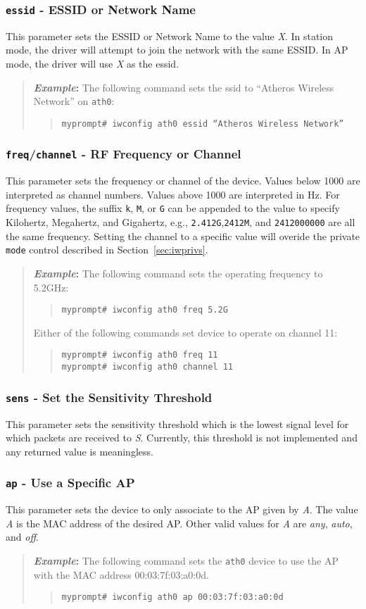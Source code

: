 \documentclass[10pt,fullpage]{article}
\newcommand{\mytt}[1]{{\texttt{#1}}}
\newcommand{\bv}{\begin{verse}}
\newcommand{\ev}{\end{verse}}
\newcommand{\cmd}[1]{{\texttt{myprompt\# #1}}}
\newcommand{\clival}[1]{{\emph{#1}}}
\newenvironment{example}{\begin{quote}\textbf{\textit{Example}:}}{\end{quote}}
\begin{document}
\subsubsection{\mytt{essid} - ESSID or Network Name}
This parameter sets the ESSID or Network Name to the value \clival{X}.  In
station mode, the driver will attempt to join the network with the
same ESSID.  In AP mode, the driver will use \clival{X} as the essid.
\begin{example}
  The following command sets the ssid to ``Atheros Wireless
  Network'' on \mytt{ath0}:
  \bv
  \cmd{iwconfig ath0 essid ``Atheros Wireless Network''}\\
  \ev
\end{example}

\subsubsection{\mytt{freq}/\mytt{channel} - RF Frequency or Channel}
This parameter sets the frequency or channel of the device.  Values
below 1000 are interpreted as channel numbers.  Values above 1000 are
interpreted in Hz.  For frequency values, the suffix \mytt{k},
\mytt{M}, or \mytt{G} can be appended to the value to specify
Kilohertz, Megahertz, and Gigahertz, e.g., \mytt{2.412G},\mytt{2412M},
and \mytt{2412000000} are all the same frequency.  Setting the channel
to a specific value will overide the private \mytt{mode} control
described in Section~\ref{sec:iwprivs}.


\begin{example}
  The following command sets the operating frequency to 5.2GHz:
  \bv
  \cmd{iwconfig ath0 freq 5.2G}
  \ev
  Either of the following commands set device to operate on channel
  11:
  \bv
  \cmd{iwconfig ath0 freq 11}\\
  \cmd{iwconfig ath0 channel 11}
  \ev
\end{example}

\subsubsection{\mytt{sens} - Set the Sensitivity Threshold}
This parameter sets the sensitivity threshold which is the lowest
signal level for which packets are received to \clival{S}.  Currently,
this threshold is not implemented and any returned value is
meaningless.

\subsubsection{\mytt{ap} - Use a Specific AP}
This parameter sets the device to only associate to the AP given by
\clival{A}.  The value \clival{A} is the MAC address of the desired
AP.  Other valid values for \clival{A} are \clival{any}, \clival{auto}, and
\clival{off}.
\begin{example}
  The following command sets the \mytt{ath0} device to use the AP with
  the MAC address 00:03:7f:03:a0:0d.
  \bv
  \cmd{iwconfig ath0 ap 00:03:7f:03:a0:0d}
  \ev
\end{example}
\end{document}
